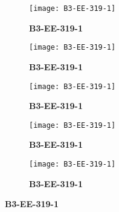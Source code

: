 \documentclass{article}
\begin{document}
\begin{figure}[]
	\centering
	\begin{subfigure}{0.19\textwidth}
		\centering
		\texttt{[image: B3-EE-319-1]}
		\caption*{\large{\textbf{B3-EE-319-1}}}
	\end{subfigure}\hfil
	\begin{subfigure}{0.19\textwidth}
		\centering
		\texttt{[image: B3-EE-319-1]}
		\caption*{\large{\textbf{B3-EE-319-1}}}
	\end{subfigure}\hfil
	\begin{subfigure}{0.19\textwidth}
		\centering
		\texttt{[image: B3-EE-319-1]}
		\caption*{\large{\textbf{B3-EE-319-1}}}
	\end{subfigure}\hfil
	\begin{subfigure}{0.19\textwidth}
		\centering
		\texttt{[image: B3-EE-319-1]}
		\caption*{\large{\textbf{B3-EE-319-1}}}
	\end{subfigure} \hfil
	\begin{subfigure}{0.19\textwidth}
		\centering
		\texttt{[image: B3-EE-319-1]}
		\caption*{\large{\textbf{B3-EE-319-1}}}
	\end{subfigure}
\end{figure}

 
\end{document}
